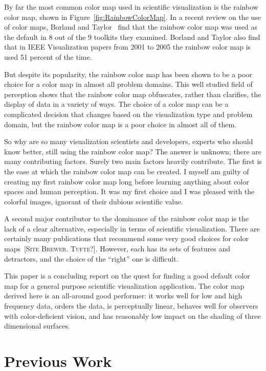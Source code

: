 \documentclass[twocolumn]{article}
\newcommand{\lcite}[1]{~\cite{#1}}
\newcommand{\scite}[1]{~\cite{#1}}
\newcommand{\sticky}[1]{\textsc{[#1]}}
\begin{document}
By far the most common color map used in scientific visualization is the
rainbow color map, shown in Figure~\ref{fig:RainbowColorMap}.  In a recent
review on the use of color maps, Borland and Taylor\scite{Borland07} find
that the rainbow color map was used as the default in 8 out of the 9
toolkits they examined.  Borland and Taylor also find that in IEEE
Visualization papers from 2001 to 2005 the rainbow color map is used 51
percent of the time.

But despite its popularity, the rainbow color map has been shown to be a
poor choice for a color map in almost all problem domains.  This well
studied field of perception shows that the rainbow color map obfuscates,
rather than clarifies, the display of data in a variety of ways.  The
choice of a color map can be a complicated decision that changes based on
the visualization type and problem domain, but the rainbow color map is a
poor choice in almost all of them.

So why are so many visualization scientists and developers, experts who
should know better, still using the rainbow color map?  The answer is
unknown; there are many contributing factors.  Surely two main factors
heavily contribute.  The first is the ease at which the rainbow color map
can be created.  I myself am guilty of creating my first rainbow color map
long before learning anything about color spaces and human perception.  It
was my first choice and I was pleased with the colorful images, ignorant of
their dubious scientific value.

A second major contributor to the dominance of the rainbow color map is the
lack of a clear alternative, especially in terms of scientific
visualization.  There are certainly many publications that recommend some
very good choices for color maps\lcite{Ware04}\sticky{Site
  Brewer. Tufte?}.  However, each has its sets of features and detractors,
and the choice of the ``right'' one is difficult.

This paper is a concluding report on the quest for finding a good default
color map for a general purpose scientific visualization application.  The
color map derived here is an all-around good performer: it works well for
low and high frequency data, orders the data, is perceptually linear,
behaves well for observers with color-deficient vision, and has reasonably
low impact on the shading of three dimensional surfaces.


\section{Previous Work}
\label{sec:PreviousWork}
\end{document}
